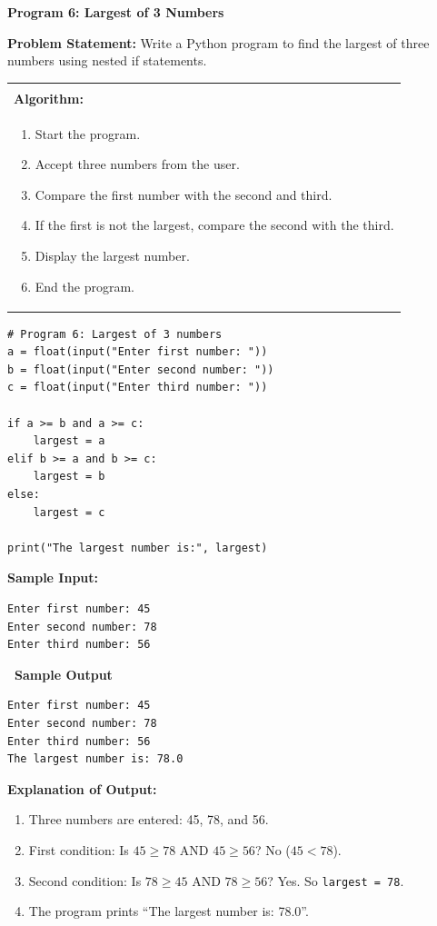 \documentclass[12pt,a4paper]{article}
\makeatletter
\newcommand{\outhead}{\noindent\colorbox{cmrgreen!25}%
  {\textbf{\small\color{cmrdark}~Sample Output~}}\par\vspace{-1pt}}
\newenvironment{algobox}{%
  \par\vspace{4pt}%
  \noindent\begin{tabular}{@{}p{\linewidth}@{}}%
  \hline\\[-8pt]%
  \textbf{\color{blue!60!black}\small Algorithm:}\\[2pt]%
}{%
  \\[-4pt]\hline%
  \end{tabular}\par\vspace{4pt}%
}
\makeatother
\begin{document}
\textbf{Program 6: Largest of 3 Numbers}

\textbf{Problem Statement:}
Write a Python program to find the largest of three numbers using nested if statements.

\begin{algobox}
\begin{enumerate}[label=Step \arabic*:]
  \item Start the program.
  \item Accept three numbers from the user.
  \item Compare the first number with the second and third.
  \item If the first is not the largest, compare the second with the third.
  \item Display the largest number.
  \item End the program.
\end{enumerate}
\end{algobox}

\begin{lstlisting}
# Program 6: Largest of 3 numbers
a = float(input("Enter first number: "))
b = float(input("Enter second number: "))
c = float(input("Enter third number: "))

if a >= b and a >= c:
    largest = a
elif b >= a and b >= c:
    largest = b
else:
    largest = c

print("The largest number is:", largest)
\end{lstlisting}

\textbf{Sample Input:}
\begin{verbatim}
Enter first number: 45
Enter second number: 78
Enter third number: 56
\end{verbatim}

\outhead
\begin{lstlisting}[style=outputstyle]
Enter first number: 45
Enter second number: 78
Enter third number: 56
The largest number is: 78.0
\end{lstlisting}

\textbf{Explanation of Output:}
\begin{enumerate}
  \item Three numbers are entered: 45, 78, and 56.
  \item First condition: Is $45 \geq 78$ AND $45 \geq 56$? No ($45 < 78$).
  \item Second condition: Is $78 \geq 45$ AND $78 \geq 56$? Yes. So \texttt{largest = 78}.
  \item The program prints ``The largest number is: 78.0''.
\end{enumerate}
\end{document}
